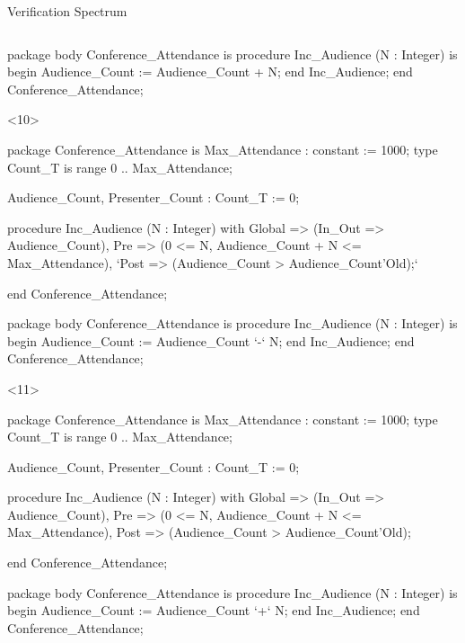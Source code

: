 \documentclass{beamer}
\begin{document}
\begin{frame}[fragile]{Verification Spectrum}
\begin{columns}
\begin{column}{9cm}
\begin{onlyenv}
\begin{pxcode}[language=SPARK,style=magic,gobble=8]
        package body Conference_Attendance
        is
           procedure Inc_Audience (N : Integer)
           is
           begin
              Audience_Count := Audience_Count + N;
           end Inc_Audience;
        end Conference_Attendance;
      \end{pxcode}
      \end{onlyenv}

      \begin{onlyenv}<10>
      \begin{pxcode}[language=SPARK,style=magic,gobble=8]
        package Conference_Attendance
        is
           Max_Attendance : constant := 1000;
           type Count_T is range 0 .. Max_Attendance;

           Audience_Count, Presenter_Count : Count_T := 0;

           procedure Inc_Audience (N : Integer)
           with Global => (In_Out => Audience_Count),
                Pre    => (0 <= N, Audience_Count + N <= Max_Attendance),
                `Post   => (Audience_Count > Audience_Count'Old);`

        end Conference_Attendance;

        package body Conference_Attendance
        is
           procedure Inc_Audience (N : Integer)
           is
           begin
              Audience_Count := Audience_Count `-` N;
           end Inc_Audience;
        end Conference_Attendance;
      \end{pxcode}
      \end{onlyenv}

      \begin{onlyenv}<11>
      \begin{pxcode}[language=SPARK,style=magic,gobble=8]
        package Conference_Attendance
        is
           Max_Attendance : constant := 1000;
           type Count_T is range 0 .. Max_Attendance;

           Audience_Count, Presenter_Count : Count_T := 0;

           procedure Inc_Audience (N : Integer)
           with Global => (In_Out => Audience_Count),
                Pre    => (0 <= N, Audience_Count + N <= Max_Attendance),
                Post   => (Audience_Count > Audience_Count'Old);

        end Conference_Attendance;

        package body Conference_Attendance
        is
           procedure Inc_Audience (N : Integer)
           is
           begin
              Audience_Count := Audience_Count `+` N;
           end Inc_Audience;
        end Conference_Attendance;
      \end{pxcode}
      \end{onlyenv}



\end{column}
\end{columns}
\end{frame}
\end{document}
